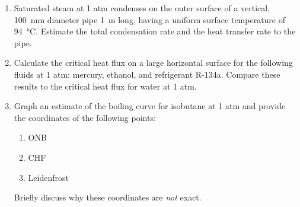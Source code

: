 \documentclass[12pt,letterpaper]{article}
\begin{document}
\begin{enumerate}
        \begin{enumerate}
            \item Derive an expression for the steady-state velocity relative to the velocity of the air for the droplets by balancing the drag force with gravity.
                Do not solve it; you will need it below.
            \item Derive an expression for $UA$.
                Do not solve it; you will need it below.
            \item Determine the air temperature and height at the point where the lead has just finished solidifying.
                In addition, determine the air temperature and additional height if the shot should be \SI{60}{\celsius} when it finally reaches the bottom.
                These are stated as separate questions but will need to be solved simultaneously.
                Use the average air temperature in each section of the flow to calculate air properties.
                You will likely have to iterate to a solution as the properties of the air flow vary as a function of height.
                \begin{enumerate}
                    \item Solve this using the $\epsilon$--NTU methodolgy.
                    \item Solve this using the logarithmic mean temperature difference methodology.
                \end{enumerate}
        \end{enumerate}
    
    \item Saturated steam at 1 atm condenses on the outer surface of a vertical, \SI{100}{\milli\meter} diameter pipe \SI{1}{\meter} long, having a uniform surface temperature of \SI{94}{\celsius}.
        Estimate the total condensation rate and the heat transfer rate to the pipe.
    
    \item  Calculate the critical heat flux on a large horizontal surface for the following fluids at 1 atm: mercury, ethanol, and refrigerant R-134a.
        Compare these results to the critical heat flux for water at 1 atm.
    
    \item Graph an estimate of the boiling curve for isobutane at 1 atm and provide the coordinates of the following points:
        \begin{enumerate}
            \item ONB
            \item CHF
            \item Leidenfrost
        \end{enumerate}
        Briefly discuss why these coordinates are \textit{not} exact.
\end{enumerate}
\end{document}
